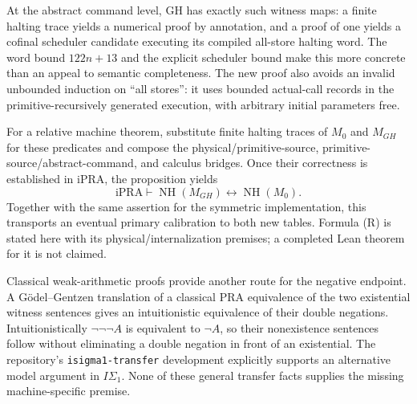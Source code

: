 \documentclass[11pt,letterpaper]{article}
\newcommand{\iPRA}{\mathrm{iPRA}}
\newcommand{\NH}{\operatorname{NH}}
\newcommand{\file}[1]{\texttt{\nolinkurl{#1}}}
\begin{document}
At the abstract command level, GH has exactly such witness maps: a finite
halting trace yields a numerical proof by annotation, and a proof of one
yields a cofinal scheduler candidate executing its compiled all-store
halting word. The word bound $122n+13$ and the explicit scheduler bound
make this more concrete than an appeal to semantic completeness. The new
proof also avoids an invalid unbounded induction on ``all stores'': it
uses bounded actual-call records in the primitive-recursively generated
execution, with arbitrary initial parameters free.

For a relative machine theorem, substitute finite halting traces of $M_0$
and $M_{GH}$ for these predicates and compose the physical/primitive-source,
primitive-source/abstract-command, and calculus bridges. Once their
correctness is established in iPRA,
the proposition yields
\[
           \iPRA\vdash\NH(M_{GH})\leftrightarrow\NH(M_0).
\tag{R}
\]
Together with the same assertion for the symmetric implementation, this
transports an eventual primary calibration to both new tables. Formula
(R) is stated here with its physical/internalization premises; a completed
Lean theorem for it is not claimed.

Classical weak-arithmetic proofs provide another route for the negative
endpoint. A Gödel--Gentzen translation of a classical PRA equivalence of
the two existential witness sentences gives an intuitionistic equivalence
of their double negations. Intuitionistically $\neg\neg\neg A$ is equivalent
to $\neg A$, so their nonexistence sentences follow without eliminating a
double negation in front of an existential. The repository's
\file{isigma1-transfer} development explicitly supports an alternative
model argument in $I\Sigma_1$. None of these general transfer facts supplies
the missing machine-specific premise.
\end{document}
